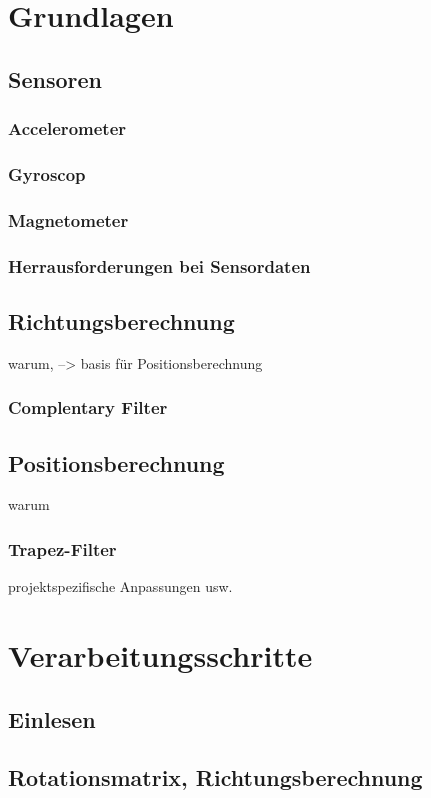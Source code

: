 \section{Grundlagen}
\subsection{Sensoren}
\subsubsection{Accelerometer}
\subsubsection{Gyroscop}
\subsubsection{Magnetometer}
\subsubsection{Herrausforderungen bei Sensordaten}


\subsection{Richtungsberechnung}
warum, --> basis für Positionsberechnung
\subsubsection{Complentary Filter}

\subsection{Positionsberechnung}
warum
\subsubsection{Trapez-Filter}
projektspezifische Anpassungen usw.

\section{Verarbeitungsschritte}
\subsection{Einlesen}
\subsection{Rotationsmatrix, Richtungsberechnung}

